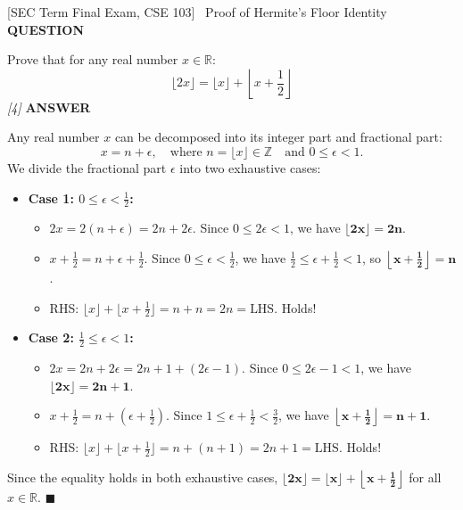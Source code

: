 \documentclass[11pt,a4paper]{article}
\newcommand{\Qlabel}{\textbf{\color{navy}\footnotesize\MakeUppercase{Question}}\par\smallskip}
\newcommand{\Alabel}{\textbf{\color{teal}\footnotesize\MakeUppercase{Answer}}\par\smallskip}
\begin{document}
\begin{exambox}{[SEC Term Final Exam, CSE 103] \ Proof of Hermite's Floor Identity}
\Qlabel
Prove that for any real number $x \in \mathbb{R}$:
\[
\lfloor 2x \rfloor = \lfloor x \rfloor + \left\lfloor x + \frac{1}{2} \right\rfloor
\]
\hfill\textit{[4]}
\tcblower
\Alabel
Any real number $x$ can be decomposed into its integer part and fractional part:
\[
x = n + \epsilon, \quad \text{where } n = \lfloor x \rfloor \in \mathbb{Z} \quad \text{and } 0 \le \epsilon < 1.
\]
We divide the fractional part $\epsilon$ into two exhaustive cases:

\begin{itemize}
    \item \textbf{Case 1: $0 \le \epsilon < \frac{1}{2}$:}
    \begin{itemize}
        \item $2x = 2(n + \epsilon) = 2n + 2\epsilon$. Since $0 \le 2\epsilon < 1$, we have $\mathbf{\lfloor 2x \rfloor = 2n}$.
        \item $x + \frac{1}{2} = n + \epsilon + \frac{1}{2}$. Since $0 \le \epsilon < \frac{1}{2}$, we have $\frac{1}{2} \le \epsilon + \frac{1}{2} < 1$, so $\mathbf{\left\lfloor x + \frac{1}{2} \right\rfloor = n}$.
        \item RHS: $\lfloor x \rfloor + \lfloor x + \frac{1}{2} \rfloor = n + n = 2n = \text{LHS}$. Holds!
    \end{itemize}

    \item \textbf{Case 2: $\frac{1}{2} \le \epsilon < 1$:}
    \begin{itemize}
        \item $2x = 2n + 2\epsilon = 2n + 1 + (2\epsilon - 1)$. Since $0 \le 2\epsilon - 1 < 1$, we have $\mathbf{\lfloor 2x \rfloor = 2n + 1}$.
        \item $x + \frac{1}{2} = n + \left(\epsilon + \frac{1}{2}\right)$. Since $1 \le \epsilon + \frac{1}{2} < \frac{3}{2}$, we have $\mathbf{\left\lfloor x + \frac{1}{2} \right\rfloor = n + 1}$.
        \item RHS: $\lfloor x \rfloor + \lfloor x + \frac{1}{2} \rfloor = n + (n + 1) = 2n + 1 = \text{LHS}$. Holds!
    \end{itemize}
\end{itemize}
Since the equality holds in both exhaustive cases, $\mathbf{\lfloor 2x \rfloor = \lfloor x \rfloor + \left\lfloor x + \frac{1}{2} \right\rfloor}$ for all $x \in \mathbb{R}$. $\blacksquare$
\end{exambox}
\end{document}
